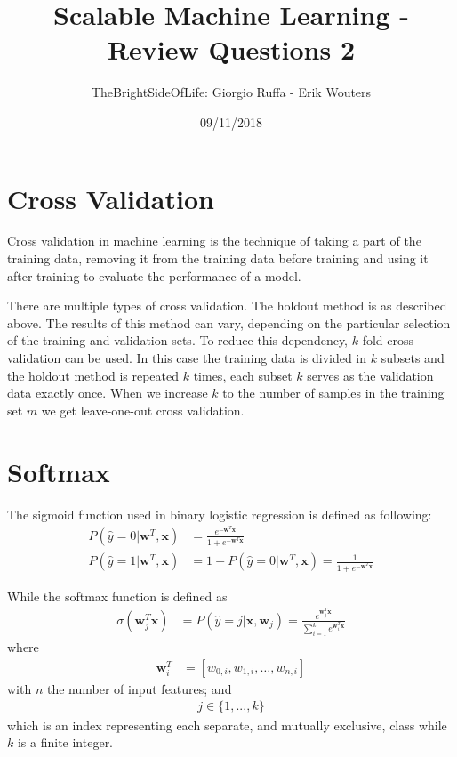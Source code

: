 \documentclass[a4paper]{article}
\title{Scalable Machine Learning - Review Questions 2}
\author{TheBrightSideOfLife: Giorgio Ruffa - Erik Wouters}
\date{09/11/2018}
\begin{document}
\maketitle

\section{Cross Validation}

Cross validation in machine learning is the technique of taking a part of the training data, removing it from the training data before training and using it after training to evaluate the performance of a model.

There are multiple types of cross validation. The holdout method is as described above. The results of this method can vary, depending on the particular selection of the training and validation sets. To reduce this dependency, $k$-fold cross validation can be used. In this case the training data is divided in $k$ subsets and the holdout method is repeated $k$ times, each subset $k$ serves as the validation data exactly once. When we increase $k$ to the number of samples in the training set $m$ we get leave-one-out cross validation.


\section{Softmax}
The sigmoid function used in binary logistic regression is defined as following:
\begin{align*}
    P(\hat{y}=0 | \mathbf{w}^{T}, \mathbf{x}) &= \frac{e^{-\mathbf{w}^T \mathbf{x}}}{1 + e^{-\mathbf{w}^T \mathbf{x}}} 
    \\
    P(\hat{y}=1 | \mathbf{w}^{T}, \mathbf{x}) &= 1 - P(\hat{y}=0 | \mathbf{w}^{T}, \mathbf{x}) = \frac{1}{1 + e^{-\mathbf{w}^T \mathbf{x}}} 
\end{align*}

While the softmax function is defined as
\begin{align}
\sigma(\mathbf{w}^T_j\mathbf{x}) &= 
P(\hat{y} = j | \mathbf{x}, \mathbf{w}_j) =
\frac{e^{\mathbf{w}^T_j\mathbf{x}}}{\sum^k_{i=1}e^{\mathbf{w}^T_i\mathbf{x}}}
\end{align}
where
\begin{align}
\mathbf{w}^T_i &= [w_{0,i},w_{1,i},\dots,w_{n,i}]
\end{align}
with $n$ the number of input features; and
\begin{align*}
    j \in \{1, ... ,k\}
\end{align*}
which is an index representing each separate, and mutually exclusive, class while $k$ is a finite integer.
\end{document}
